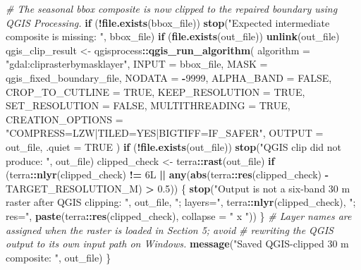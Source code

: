 \documentclass[
]{article}
\newenvironment{Shaded}{\begin{snugshade}}{\end{snugshade}}
\newcommand{\AttributeTok}[1]{\textcolor[rgb]{0.13,0.29,0.53}{#1}}
\newcommand{\CommentTok}[1]{\textcolor[rgb]{0.56,0.35,0.01}{\textit{#1}}}
\newcommand{\ConstantTok}[1]{\textcolor[rgb]{0.56,0.35,0.01}{#1}}
\newcommand{\ControlFlowTok}[1]{\textcolor[rgb]{0.13,0.29,0.53}{\textbf{#1}}}
\newcommand{\DataTypeTok}[1]{\textcolor[rgb]{0.13,0.29,0.53}{#1}}
\newcommand{\DecValTok}[1]{\textcolor[rgb]{0.00,0.00,0.81}{#1}}
\newcommand{\FloatTok}[1]{\textcolor[rgb]{0.00,0.00,0.81}{#1}}
\newcommand{\FunctionTok}[1]{\textcolor[rgb]{0.13,0.29,0.53}{\textbf{#1}}}
\newcommand{\NormalTok}[1]{#1}
\newcommand{\OtherTok}[1]{\textcolor[rgb]{0.56,0.35,0.01}{#1}}
\newcommand{\SpecialCharTok}[1]{\textcolor[rgb]{0.81,0.36,0.00}{\textbf{#1}}}
\newcommand{\StringTok}[1]{\textcolor[rgb]{0.31,0.60,0.02}{#1}}
\begin{document}
\begin{Shaded}
\begin{Highlighting}[]
  \CommentTok{\# The seasonal bbox composite is now clipped to the repaired boundary using QGIS Processing.}
  \ControlFlowTok{if}\NormalTok{ (}\SpecialCharTok{!}\FunctionTok{file.exists}\NormalTok{(bbox\_file)) }\FunctionTok{stop}\NormalTok{(}\StringTok{"Expected intermediate composite is missing: "}\NormalTok{, bbox\_file)}
  \ControlFlowTok{if}\NormalTok{ (}\FunctionTok{file.exists}\NormalTok{(out\_file)) }\FunctionTok{unlink}\NormalTok{(out\_file)}
\NormalTok{  qgis\_clip\_result }\OtherTok{\textless{}{-}}\NormalTok{ qgisprocess}\SpecialCharTok{::}\FunctionTok{qgis\_run\_algorithm}\NormalTok{(}
    \AttributeTok{algorithm =} \StringTok{"gdal:cliprasterbymasklayer"}\NormalTok{,}
    \AttributeTok{INPUT =}\NormalTok{ bbox\_file,}
    \AttributeTok{MASK =}\NormalTok{ qgis\_fixed\_boundary\_file,}
    \AttributeTok{NODATA =} \SpecialCharTok{{-}}\DecValTok{9999}\NormalTok{,}
    \AttributeTok{ALPHA\_BAND =} \ConstantTok{FALSE}\NormalTok{,}
    \AttributeTok{CROP\_TO\_CUTLINE =} \ConstantTok{TRUE}\NormalTok{,}
    \AttributeTok{KEEP\_RESOLUTION =} \ConstantTok{TRUE}\NormalTok{,}
    \AttributeTok{SET\_RESOLUTION =} \ConstantTok{FALSE}\NormalTok{,}
    \AttributeTok{MULTITHREADING =} \ConstantTok{TRUE}\NormalTok{,}
    \AttributeTok{CREATION\_OPTIONS =} \StringTok{"COMPRESS=LZW|TILED=YES|BIGTIFF=IF\_SAFER"}\NormalTok{,}
    \AttributeTok{OUTPUT =}\NormalTok{ out\_file,}
    \AttributeTok{.quiet =} \ConstantTok{TRUE}
\NormalTok{  )}
  \ControlFlowTok{if}\NormalTok{ (}\SpecialCharTok{!}\FunctionTok{file.exists}\NormalTok{(out\_file)) }\FunctionTok{stop}\NormalTok{(}\StringTok{"QGIS clip did not produce: "}\NormalTok{, out\_file)}
\NormalTok{  clipped\_check }\OtherTok{\textless{}{-}}\NormalTok{ terra}\SpecialCharTok{::}\FunctionTok{rast}\NormalTok{(out\_file)}
  \ControlFlowTok{if}\NormalTok{ (terra}\SpecialCharTok{::}\FunctionTok{nlyr}\NormalTok{(clipped\_check) }\SpecialCharTok{!=} \DecValTok{6}\DataTypeTok{L} \SpecialCharTok{||} \FunctionTok{any}\NormalTok{(}\FunctionTok{abs}\NormalTok{(terra}\SpecialCharTok{::}\FunctionTok{res}\NormalTok{(clipped\_check) }\SpecialCharTok{{-}}\NormalTok{ TARGET\_RESOLUTION\_M) }\SpecialCharTok{\textgreater{}} \FloatTok{0.5}\NormalTok{)) \{}
    \FunctionTok{stop}\NormalTok{(}\StringTok{"Output is not a six{-}band 30 m raster after QGIS clipping: "}\NormalTok{, out\_file,}
         \StringTok{"; layers="}\NormalTok{, terra}\SpecialCharTok{::}\FunctionTok{nlyr}\NormalTok{(clipped\_check), }\StringTok{"; res="}\NormalTok{, }\FunctionTok{paste}\NormalTok{(terra}\SpecialCharTok{::}\FunctionTok{res}\NormalTok{(clipped\_check), }\AttributeTok{collapse =} \StringTok{" x "}\NormalTok{))}
\NormalTok{  \}}
  \CommentTok{\# Layer names are assigned when the raster is loaded in Section 5; avoid}
  \CommentTok{\# rewriting the QGIS output to its own input path on Windows.}
  \FunctionTok{message}\NormalTok{(}\StringTok{"Saved QGIS{-}clipped 30 m composite: "}\NormalTok{, out\_file)}
\NormalTok{\}}


\end{Highlighting}
\end{Shaded}
\end{document}
